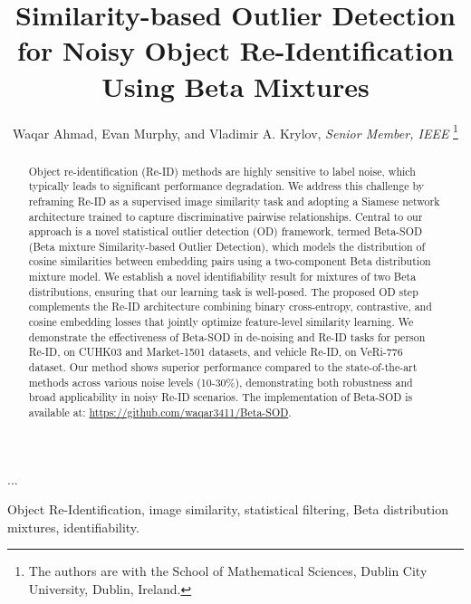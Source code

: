 \documentclass[lettersize,journal]{IEEEtran}
\begin{document}
\title{Similarity-based Outlier Detection for Noisy Object Re-Identification\\Using Beta Mixtures}

\author{Waqar Ahmad, 
    Evan Murphy, 
    and Vladimir A. Krylov, 
    {\it Senior Member, IEEE}
\thanks{
 The authors are with the
 School of Mathematical Sciences,
 Dublin City University,  
 Dublin, Ireland.}}%

\markboth{}%
{...}


\maketitle

\begin{abstract}
Object re-identification (Re-ID) methods are highly sensitive to label noise, which typically leads to significant performance degradation. 
We address this challenge by reframing Re-ID as a supervised image similarity task and adopting a Siamese network architecture trained to capture discriminative pairwise relationships. Central to our approach is a novel statistical outlier detection (OD) framework, termed Beta-SOD (Beta mixture Similarity-based Outlier Detection), which models the distribution of cosine similarities between embedding pairs using a two-component Beta distribution mixture model. 
We establish a novel identifiability result for mixtures of two Beta distributions, ensuring that our learning task is well-posed.
The proposed OD step complements the Re-ID architecture combining binary cross-entropy, contrastive, and cosine embedding losses that jointly optimize feature-level similarity learning.
We demonstrate the effectiveness of Beta-SOD in de-noising and Re-ID tasks for person Re-ID, on CUHK03 and Market-1501 datasets, and vehicle Re-ID, on VeRi-776 dataset. Our method shows superior performance compared to the state-of-the-art methods across various noise levels (10-30\%), demonstrating both robustness and broad applicability in noisy Re-ID scenarios. The implementation of Beta-SOD is available at: \url{https://github.com/waqar3411/Beta-SOD}.
\end{abstract}

\begin{IEEEkeywords}
Object Re-Identification, image similarity, statistical filtering, Beta distribution mixtures, identifiability.
\end{IEEEkeywords}
\end{document}
